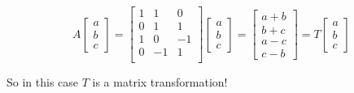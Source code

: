 \documentclass[pdf
]{beamer}
\begin{document}
{{\begin{example}[Revisited]
\[
A\left[\begin{array}{r} a \\ b\\ c \end{array}\right]
=
\left[ \begin{array}{rrr}
1 & 1 & 0 \\
0 & 1 & 1 \\
1 & 0 & -1 \\
0 & -1 & 1 \\
\end{array}
\right]
\left[\begin{array}{r} a \\ b\\ c \end{array}\right]
=
\left[ \begin{array}{c} 
a+b \\ b+c \\ a-c\\ c-b \end{array}\right]
=
T\left[\begin{array}{c} a \\ b\\ c\end{array}\right]
\]

\pause 

\alert{So in this case $T$ is a matrix transformation!}
\end{example}
}}



\end{document}
